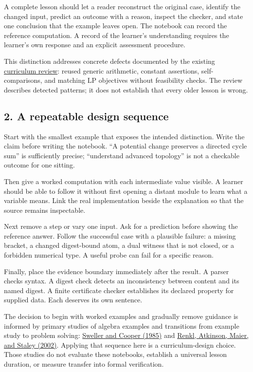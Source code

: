 \documentclass[
  11pt,
]{article}
\begin{document}
A complete lesson should let a reader reconstruct the original case,
identify the changed input, predict an outcome with a reason, inspect
the checker, and state one conclusion that the example leaves open. The
notebook can record the reference computation. A record of the learner's
understanding requires the learner's own response and an explicit
assessment procedure.

This distinction addresses concrete defects documented by the existing
\href{https://github.com/dbccpage/the_symbol_game/blob/52cb5457f6c485ba548cfd292f6012a941ed22cf/omega_engine_education/the_symbol_game/lessons/system_integration/curriculum_125_review.md}{curriculum
review}: reused generic arithmetic, constant assertions,
self-comparisons, and matching LP objectives without feasibility checks.
The review describes detected patterns; it does not establish that every
older lesson is wrong.

\subsection{2. A repeatable design
sequence}\label{a-repeatable-design-sequence}

Start with the smallest example that exposes the intended distinction.
Write the claim before writing the notebook. ``A potential change
preserves a directed cycle sum'' is sufficiently precise; ``understand
advanced topology'' is not a checkable outcome for one sitting.

Then give a worked computation with each intermediate value visible. A
learner should be able to follow it without first opening a distant
module to learn what a variable means. Link the real implementation
beside the explanation so that the source remains inspectable.

Next remove a step or vary one input. Ask for a prediction before
showing the reference answer. Follow the successful case with a
plausible failure: a missing bracket, a changed digest-bound atom, a
dual witness that is not closed, or a forbidden numerical type. A useful
probe can fail for a specific reason.

Finally, place the evidence boundary immediately after the result. A
parser checks syntax. A digest check detects an inconsistency between
content and its named digest. A finite certificate checker establishes
its declared property for supplied data. Each deserves its own sentence.

The decision to begin with worked examples and gradually remove guidance
is informed by primary studies of algebra examples and transitions from
example study to problem solving:
\href{https://www.tandfonline.com/doi/abs/10.1207/s1532690xci0201_3}{Sweller
and Cooper (1985)} and
\href{https://www.tandfonline.com/doi/abs/10.1080/00220970209599510}{Renkl,
Atkinson, Maier, and Staley (2002)}. Applying that sequence here is a
curriculum-design choice. Those studies do not evaluate these notebooks,
establish a universal lesson duration, or measure transfer into formal
verification.
\end{document}
